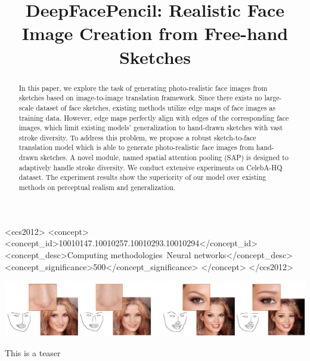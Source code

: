 \documentclass[sigconf,anonymous,review]{acmart}
\begin{document}
\title{DeepFacePencil: Realistic Face Image Creation from Free-hand Sketches}

\begin{abstract}
In this paper, we explore the task of generating photo-realistic face images from sketches based on image-to-image translation framework. 
Since there exists no large-scale dataset of face sketches, existing methods utilize edge maps of face images as training data. However, edge maps perfectly align with edges of the corresponding face images, which limit existing models' generalization to hand-drawn sketches with vast stroke diversity. 
To address this problem, we propose a robust sketch-to-face translation model which is able to generate photo-realistic face images from hand-drawn sketches. 
A novel module, named spatial attention pooling (SAP) is designed to adaptively handle stroke diversity.
We conduct extensive experiments on CelebA-HQ dataset. The experiment results show the superiority of our model over existing methods on perceptual realism and generalization.
\end{abstract}

%
\begin{CCSXML}
	<ccs2012>
	<concept>
	<concept_id>10010147.10010257.10010293.10010294</concept_id>
	<concept_desc>Computing methodologies~Neural networks</concept_desc>
	<concept_significance>500</concept_significance>
	</concept>
	</ccs2012>
\end{CCSXML}



%
%



\begin{teaserfigure}
	\includegraphics[width=\textwidth]{figs/teaser.png}
	\caption{This is a teaser}
	\label{fig:teaser}
\end{teaserfigure}


\maketitle







\balance 


\end{document}
